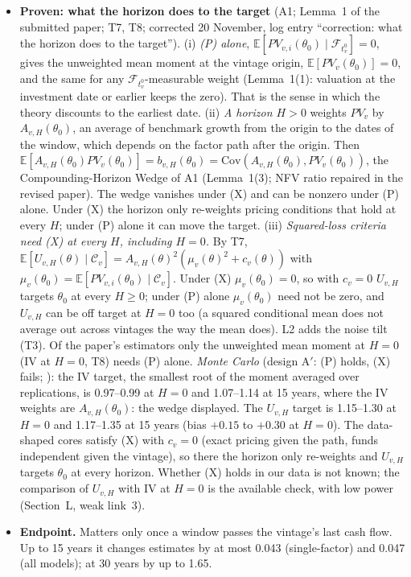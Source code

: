 \documentclass[11pt]{article}
\newcommand{\E}{\mathbb{E}}
\newcommand{\Cov}{\mathrm{Cov}}
\newcommand{\file}[1]{\path{#1}}
\newcommand{\C}{\mathcal{C}}
\newcommand{\F}{\mathcal{F}}
\begin{document}
\begin{itemize}
\item \textbf{Proven: what the horizon does to the target} (A1; Lemma~1 of the submitted paper; T7, T8; corrected 20 November, log entry ``correction: what the horizon does to the target''). (i) \emph{(P) alone}, $\E[PV_{v,i}(\theta_0)\mid\F_{t_v^0}]=0$, gives the unweighted mean moment at the vintage origin, $\E[PV_v(\theta_0)]=0$, and the same for any $\F_{t_v^0}$-measurable weight (Lemma~1(1): valuation at the investment date or earlier keeps the zero). That is the sense in which the theory discounts to the earliest date. (ii) \emph{A horizon $H>0$} weights $PV_v$ by $A_{v,H}(\theta_0)$, an average of benchmark growth from the origin to the dates of the window, which depends on the factor path after the origin. Then $\E[A_{v,H}(\theta_0)PV_v(\theta_0)]=b_{v,H}(\theta_0)=\Cov(A_{v,H}(\theta_0),PV_v(\theta_0))$, the Compounding-Horizon Wedge of A1 (Lemma~1(3); NFV ratio repaired in the revised paper). The wedge vanishes under (X) and can be nonzero under (P) alone. Under (X) the horizon only re-weights pricing conditions that hold at every $H$; under (P) alone it can move the target. (iii) \emph{Squared-loss criteria need (X) at every $H$, including $H=0$.} By T7, $\E[U_{v,H}(\theta)\mid\C_v]=A_{v,H}(\theta)^2(\mu_v(\theta)^2+c_v(\theta))$ with $\mu_v(\theta_0)=\E[PV_{v,i}(\theta_0)\mid\C_v]$. Under (X) $\mu_v(\theta_0)=0$, so with $c_v=0$ $U_{v,H}$ targets $\theta_0$ at every $H\ge0$; under (P) alone $\mu_v(\theta_0)$ need not be zero, and $U_{v,H}$ can be off target at $H=0$ too (a squared conditional mean does not average out across vintages the way the mean does). L2 adds the noise tilt (T3). Of the paper's estimators only the unweighted mean moment at $H=0$ (IV at $H=0$, T8) needs (P) alone. \emph{Monte Carlo} (design A$'$: (P) holds, (X) fails; \file{results/mc_step4/summary.csv}): the IV target, the smallest root of the moment averaged over replications, is 0.97--0.99 at $H=0$ and 1.07--1.14 at 15 years, where the IV weights are $A_{v,H}(\theta_0)$: the wedge displayed. The $U_{v,H}$ target is 1.15--1.30 at $H=0$ and 1.17--1.35 at 15 years (bias $+0.15$ to $+0.30$ at $H=0$). The data-shaped cores satisfy (X) with $c_v=0$ (exact pricing given the path, funds independent given the vintage), so there the horizon only re-weights and $U_{v,H}$ targets $\theta_0$ at every horizon. Whether (X) holds in our data is not known; the comparison of $U_{v,H}$ with IV at $H=0$ is the available check, with low power (Section~L, weak link~3).
\item \textbf{Endpoint.} Matters only once a window passes the vintage's last cash flow. Up to 15 years it changes estimates by at most 0.043 (single-factor) and 0.047 (all models); at 30 years by up to 1.65.

\end{itemize}
\end{document}
